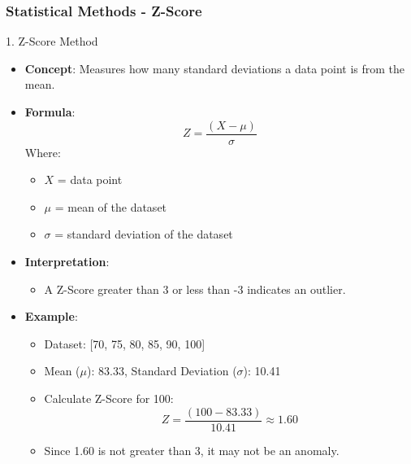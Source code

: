 \documentclass{beamer}
\begin{document}
\begin{frame}[fragile]
    \frametitle{Statistical Methods - Z-Score}
    \begin{block}{1. Z-Score Method}
        \begin{itemize}
            \item \textbf{Concept}: Measures how many standard deviations a data point is from the mean.
            \item \textbf{Formula}:
            \begin{equation}
            Z = \frac{(X - \mu)}{\sigma}
            \end{equation}
            Where:
            \begin{itemize}
                \item $X$ = data point
                \item $\mu$ = mean of the dataset
                \item $\sigma$ = standard deviation of the dataset
            \end{itemize}
            \item \textbf{Interpretation}: 
            \begin{itemize}
                \item A Z-Score greater than 3 or less than -3 indicates an outlier.
            \end{itemize}
            \item \textbf{Example}:
            \begin{itemize}
                \item Dataset: [70, 75, 80, 85, 90, 100]
                \item Mean ($\mu$): 83.33, Standard Deviation ($\sigma$): 10.41
                \item Calculate Z-Score for 100:
                \begin{equation}
                Z = \frac{(100 - 83.33)}{10.41} \approx 1.60
                \end{equation}
                \item Since 1.60 is not greater than 3, it may not be an anomaly.
            \end{itemize}
        \end{itemize}
    \end{block}
\end{frame}
\end{document}
